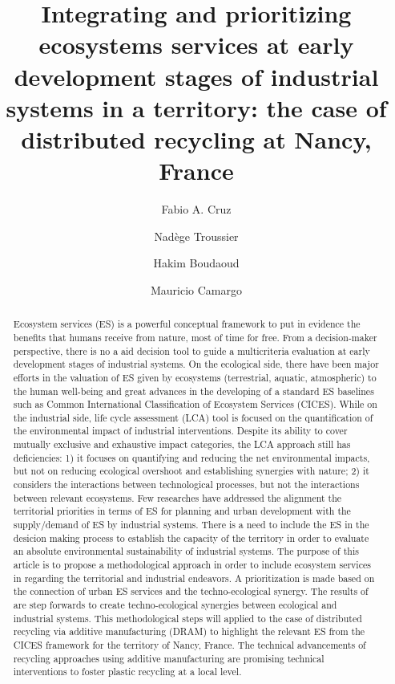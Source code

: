 \documentclass[]{elsarticle} %
\begin{document}
\begin{frontmatter}

  \title{Integrating and prioritizing ecosystems services at early development stages of industrial systems in a territory: the case of distributed recycling at Nancy, France}
    \author[UTT]{Fabio A. Cruz}
    \author[UTT]{Nadège Troussier}
  
    \author[UL]{Hakim Boudaoud}
  
    \author[UL]{Mauricio Camargo}
  
      \address[UTT]{Universite de Technologie de Troyes, Troyes, France}
    \address[UL]{ERPI, Université de Lorraine, F-54000 Nancy, France.}
  
  \begin{abstract}
  Ecosystem services (ES) is a powerful conceptual framework to put in evidence the benefits that humans receive from nature, most of time for free.
  From a decision-maker perspective, there is no a aid decision tool to guide a multicriteria evaluation at early development stages of industrial systems.
  On the ecological side, there have been major efforts in the valuation of ES given by ecosystems (terrestrial, aquatic, atmospheric) to the human well-being and great advances in the developing of a standard ES baselines such as Common International Classification of Ecosystem Services (CICES).
  While on the industrial side, life cycle assessment (LCA) tool is focused on the quantification of the environmental impact of industrial interventions. Despite its ability to cover mutually exclusive and exhaustive impact categories, the LCA approach still has deficiencies: 1) it focuses on quantifying and reducing the net environmental impacts, but not on reducing ecological overshoot and establishing synergies with nature; 2) it considers the interactions between technological processes, but not the interactions between relevant ecosystems.
  Few researches have addressed the alignment the territorial priorities in terms of ES for planning and urban development with the supply/demand of ES by industrial systems.
  There is a need to include the ES in the desicion making process to establish the capacity of the territory in order to evaluate an absolute environmental sustainability of industrial systems.
  The purpose of this article is to propose a methodological approach in order to include ecosystem services in regarding the territorial and industrial endeavors.
  A prioritization is made based on the connection of urban ES services and the techno-ecological synergy.
  The results of are step forwards to create techno-ecological synergies between ecological and industrial systems.
  This methodological steps will applied to the case of distributed recycling via additive manufacturing (DRAM) to highlight the relevant ES from the CICES framework for the territory of Nancy, France.
  The technical advancements of recycling approaches using additive manufacturing are promising technical interventions to foster plastic recycling at a local level.
  \end{abstract}
  
 \end{frontmatter}
\end{document}
